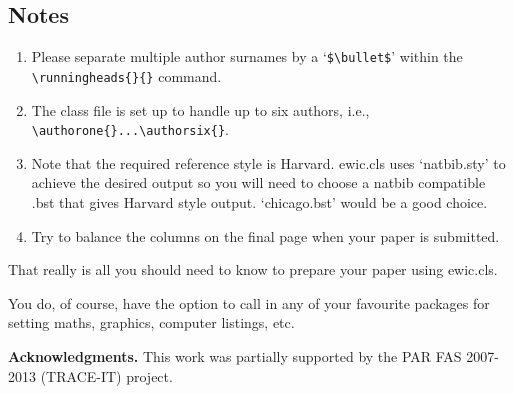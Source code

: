 \documentclass{ewic}
\begin{document}
\pagebreak
\subsection{Notes}
\begin{enumerate}
\item Please separate multiple author surnames by a `\verb+$\bullet$+' within the
\verb+\runningheads{}{}+ command.

\item The class file is set up to handle up to six authors, i.e., \verb+\authorone{}...\authorsix{}+.

\item Note that the required reference style is Harvard. ewic.cls
uses `natbib.sty' to achieve the desired output so you will need
to choose a natbib compatible .bst that gives Harvard style
output. `chicago.bst' would be a good choice.

\item Try to balance the columns on the final page when your paper is submitted.
\end{enumerate}

That really is all you should need to know to prepare your paper
using ewic.cls.\citep{Mills2003}

You do, of course, have the option to call in any of your
favourite packages for setting maths, graphics, computer listings,
etc.

\textbf{Acknowledgments. }
This work was partially supported by the PAR FAS 2007-2013 (TRACE-IT) project.

%
%
%
%



\end{document}
